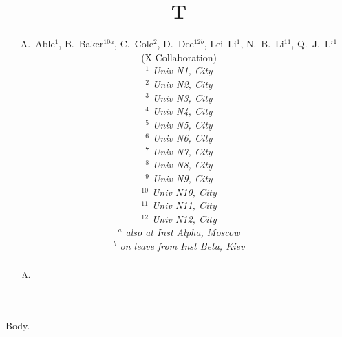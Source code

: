 \documentclass[preprint,11pt]{elsarticle}
\begin{document}
\begin{frontmatter}
\title{T}
\author{
\begin{small}
A.~Able$^{1}$, B.~Baker$^{10a}$, C.~Cole$^{2}$, D.~Dee$^{12b}$, Lei~Li$^{1}$, N.~B.~Li$^{11}$, Q.~J.~Li$^{1}$
\\
\vspace{0.2cm}
(X Collaboration)\\
\vspace{0.2cm} {\it
$^{1}$ Univ N1, City\\
$^{2}$ Univ N2, City\\
$^{3}$ Univ N3, City\\
$^{4}$ Univ N4, City\\
$^{5}$ Univ N5, City\\
$^{6}$ Univ N6, City\\
$^{7}$ Univ N7, City\\
$^{8}$ Univ N8, City\\
$^{9}$ Univ N9, City\\
$^{10}$ Univ N10, City\\
$^{11}$ Univ N11, City\\
$^{12}$ Univ N12, City\\
\vspace{0.2cm}
$^{a}$ also at Inst Alpha, Moscow\\
$^{b}$ on leave from Inst Beta, Kiev\\
\vspace{7cm}
}
\end{small}
}
\begin{abstract}
A.
\end{abstract}
\end{frontmatter}
Body.
\end{document}
